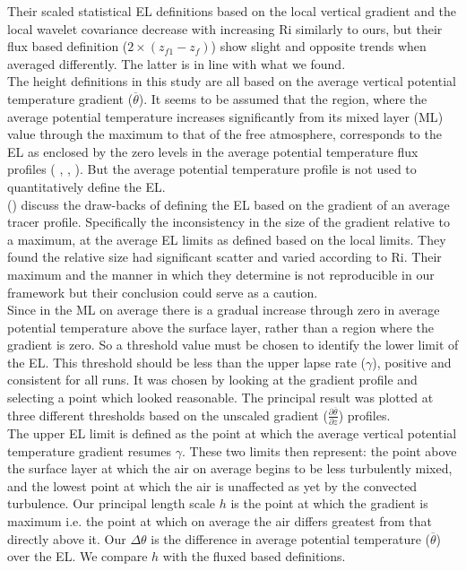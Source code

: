 Their scaled statistical \acs{EL} definitions based on the local vertical gradient and the local wavelet covariance decrease with increasing \acs{Ri} similarly to ours, but their flux based definition ($2\times(z_{f1}-z_{f})$) show slight and opposite trends when averaged differently.  The latter is in line with what we found.\\


The height definitions in this study are all based on the average vertical potential temperature gradient ($\overline{\theta}$).  It seems to be assumed that the region, where the average potential temperature increases significantly from its mixed layer (\acs{ML}) value through the maximum to that of the free atmosphere, corresponds to the \acs{EL} as enclosed by the zero levels in the average potential temperature flux profiles (\citeauthor{Deardorff79} \cite{Deardorff79}, \citeauthor{FedConzMir04} 
\cite{FedConzMir04}, \citeauthor{GarciaMellado} \cite{GarciaMellado}).  But the average potential temperature profile is not used to quantitatively define the \acs{EL}.\\

\citeauthor{BrooksFowler2} (\cite{BrooksFowler2}) discuss the draw-backs of defining the \acs{EL} based on the 
gradient of an average tracer profile.  Specifically the inconsistency in the size of the gradient
relative to a maximum, at the average \acs{EL} limits as defined based on the local limits. They
found the relative size had significant scatter and varied according to \acs{Ri}. Their maximum and the manner in which they determine is not reproducible in our framework but their conclusion could serve as a caution.\\  

Since in the \acs{ML} on average there is a gradual increase through zero in average potential temperature above the surface layer, rather than a region where the gradient is zero.  So a threshold value must be chosen to identify the lower limit of the \acs{EL}.  This threshold should be less than the upper lapse rate ($\gamma$), positive and consistent for all runs.  It was chosen by looking at the gradient profile and selecting a point which looked reasonable. The principal result was plotted at three different thresholds based on the unscaled gradient ($\frac{\partial \overline{\theta}}{\partial z}$) profiles.\\

The upper \acs{EL} limit is defined as the point at which the average vertical potential temperature gradient resumes $\gamma$.  These two limits then represent: the point above the surface layer at which the air on average begins to be less turbulently mixed, and the lowest point at which the air is unaffected as yet by the convected turbulence.  Our principal length scale $h$ is the point at which the gradient is maximum i.e. the point at which on average the air differs greatest from that directly above it. Our $\Delta \theta$ is the difference in average potential temperature ($\overline{\theta}$) over the \acs{EL}.  We compare $h$ with the fluxed based definitions.
  
